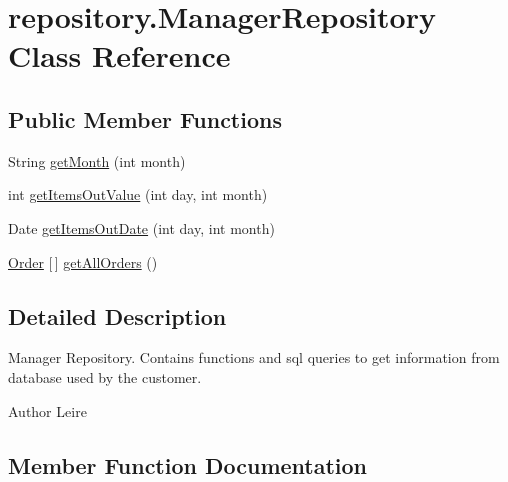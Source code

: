 \hypertarget{classrepository_1_1_manager_repository}{}\section{repository.\+Manager\+Repository Class Reference}
\label{classrepository_1_1_manager_repository}
\subsection*{Public Member Functions}
\begin{DoxyCompactItemize}
\item 
String \mbox{\hyperlink{classrepository_1_1_manager_repository_ae52c653f3008bfa5bc0f5af8dab9db43}{get\+Month}} (int month)
\item 
int \mbox{\hyperlink{classrepository_1_1_manager_repository_a0e915572c7802a1e4503c558cabab270}{get\+Items\+Out\+Value}} (int day, int month)
\item 
Date \mbox{\hyperlink{classrepository_1_1_manager_repository_a674b19911835ed9b14bc4e8ad6bbad95}{get\+Items\+Out\+Date}} (int day, int month)
\item 
\mbox{\hyperlink{classentity_1_1_order}{Order}} \mbox{[}$\,$\mbox{]} \mbox{\hyperlink{classrepository_1_1_manager_repository_aa79e0ef0402a40bb0cc00694ca02adf2}{get\+All\+Orders}} ()
\end{DoxyCompactItemize}


\subsection{Detailed Description}
Manager Repository. Contains functions and sql queries to get information from database used by the customer.

\begin{DoxyAuthor}{Author}
Leire 
\end{DoxyAuthor}


\subsection{Member Function Documentation}
\mbox{\label{classrepository_1_1_manager_repository_aa79e0ef0402a40bb0cc00694ca02adf2}} 
